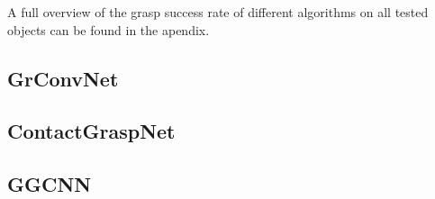 A full overview of the grasp success rate of different algorithms on all tested objects can be found in the apendix.

\subsection{GrConvNet}
\subsection{ContactGraspNet}
\subsection{GGCNN}

